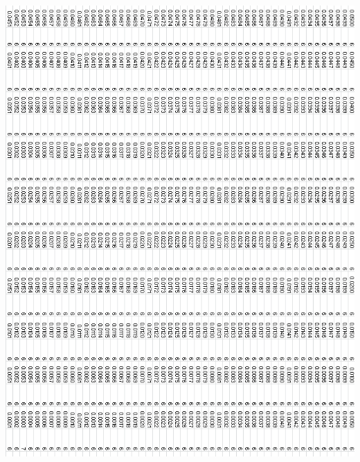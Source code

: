 \documentclass{article}
\begin{document}
\begin{center}
 \includegraphics[keepaspectratio,scale=0.83]{111_2000/005to000SpinChart.png}
\end{center}
\clearpage
\end{document}
